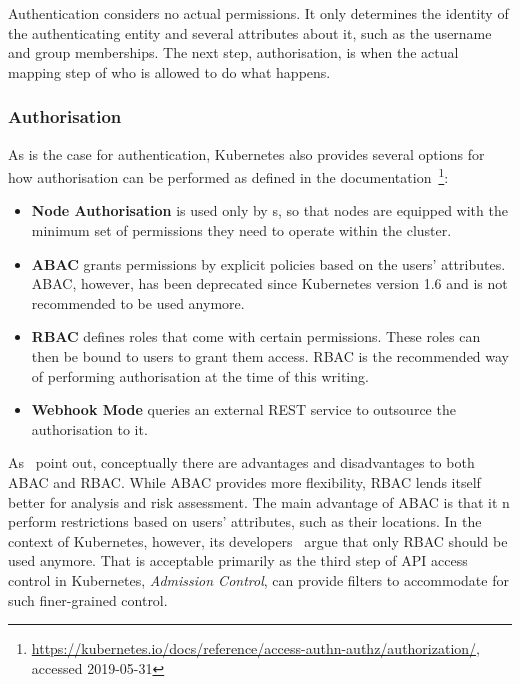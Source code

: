 Authentication considers no actual permissions. It only determines the identity of the authenticating entity and several attributes about it, such as the username and group memberships. The next step, authorisation, is when the actual mapping step of who is allowed to do what happens. 

\subsubsection{Authorisation} \label{authorisation}

As is the case for authentication, Kubernetes also provides several options for how authorisation can be performed as defined in the documentation~\textcite{k8sdocs}\footnote{\url{https://kubernetes.io/docs/reference/access-authn-authz/authorization/}, accessed 2019-05-31}:

\begin{itemize}
    \item \textbf{Node Authorisation} is used only by s, so that nodes are equipped with the minimum set of permissions they need to operate within the cluster.
    \item \textbf{\ac{ABAC}} grants permissions by explicit policies based on the users' attributes. \ac{ABAC}, however, has been deprecated since Kubernetes version 1.6 and is not recommended to be used anymore.
    \item \textbf{\ac{RBAC}} defines roles that come with certain permissions. These roles can then be bound to users to grant them access. \ac{RBAC} is the recommended way of performing authorisation at the time of this writing.
    \item \textbf{Webhook Mode} queries an external REST service to outsource the authorisation to it.
\end{itemize}



As~\textcite{ABACvsRBAC} point out, conceptually there are advantages and disadvantages to both \ac{ABAC} and \ac{RBAC}. While \ac{ABAC} provides more flexibility, \ac{RBAC} lends itself better for analysis and risk assessment. The main advantage of \ac{ABAC} is that it n perform restrictions based on users' attributes, such as their locations. In the context of Kubernetes, however, its developers~\textcite{ABACvsRBACk8s} argue that only \ac{RBAC} should be used anymore. That is acceptable primarily as the third step of API access control in Kubernetes, \textit{Admission Control}, can provide filters to accommodate for such finer-grained control.

